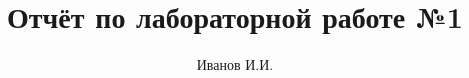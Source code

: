 \title{Отчёт по лабораторной работе №1}
\author{Иванов И.И.}

\usepackage[a4paper, left=20mm, top=15mm, right=15mm, bottom=15mm]{geometry}
\setmainfont{Lato}

\usepackage[colorlinks=true]{hyperref}


\usepackage{caption}
\captionsetup[figure]{name=Рисунок, labelsep=endash}

\renewcommand{\contentsname}{Оглавление}


\usepackage{titlesec}
\newcommand{\sectionbreak}{\clearpage}

\usepackage{fancyhdr}
\pagestyle{fancy}
\fancyhf{}
\renewcommand{\headrulewidth}{0pt}
\fancyfoot[R]{\thepage}
